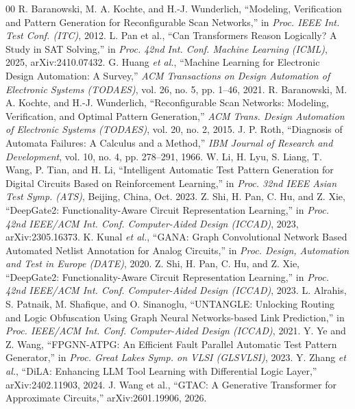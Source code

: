 \documentclass[conference]{IEEEtran}
\begin{document}
\begin{thebibliography}{00}
    R. Baranowski, M. A. Kochte, and H.-J. Wunderlich, ``Modeling, Verification and Pattern Generation for Reconfigurable Scan Networks,'' in \emph{Proc. IEEE Int. Test Conf. (ITC)}, 2012.
    L. Pan et al., ``Can Transformers Reason Logically? A Study in SAT Solving,'' in \emph{Proc. 42nd Int. Conf. Machine Learning (ICML)}, 2025, arXiv:2410.07432.
    G. Huang \emph{et al.}, ``Machine Learning for Electronic Design Automation: A Survey,'' \emph{ACM Transactions on Design Automation of Electronic Systems (TODAES)}, vol. 26, no. 5, pp. 1--46, 2021.
    R. Baranowski, M. A. Kochte, and H.-J. Wunderlich, ``Reconfigurable Scan Networks: Modeling, Verification, and Optimal Pattern Generation,'' \emph{ACM Trans. Design Automation of Electronic Systems (TODAES)}, vol. 20, no. 2, 2015.
    J. P. Roth, ``Diagnosis of Automata Failures: A Calculus and a Method,'' \emph{IBM Journal of Research and Development}, vol. 10, no. 4, pp. 278--291, 1966.
    W. Li, H. Lyu, S. Liang, T. Wang, P. Tian, and H. Li, ``Intelligent Automatic Test Pattern Generation for Digital Circuits Based on Reinforcement Learning,'' in \emph{Proc. 32nd IEEE Asian Test Symp. (ATS)}, Beijing, China, Oct. 2023.
    Z. Shi, H. Pan, C. Hu, and Z. Xie, ``DeepGate2: Functionality-Aware Circuit Representation Learning,'' in \emph{Proc. 42nd IEEE/ACM Int. Conf. Computer-Aided Design (ICCAD)}, 2023, arXiv:2305.16373.
    K. Kunal \emph{et al.}, ``GANA: Graph Convolutional Network Based Automated Netlist Annotation for Analog Circuits,'' in \emph{Proc. Design, Automation and Test in Europe (DATE)}, 2020.
    Z. Shi, H. Pan, C. Hu, and Z. Xie, ``DeepGate2: Functionality-Aware Circuit Representation Learning,'' in \emph{Proc. 42nd IEEE/ACM Int. Conf. Computer-Aided Design (ICCAD)}, 2023.
    L. Alrahis, S. Patnaik, M. Shafique, and O. Sinanoglu, ``UNTANGLE: Unlocking Routing and Logic Obfuscation Using Graph Neural Networks-based Link Prediction,'' in \emph{Proc. IEEE/ACM Int. Conf. Computer-Aided Design (ICCAD)}, 2021.
    Y. Ye and Z. Wang, ``FPGNN-ATPG: An Efficient Fault Parallel Automatic Test Pattern Generator,'' in \emph{Proc. Great Lakes Symp. on VLSI (GLSVLSI)}, 2023.
    Y. Zhang \emph{et al.}, ``DiLA: Enhancing LLM Tool Learning with Differential Logic Layer,'' arXiv:2402.11903, 2024.
    J. Wang et al., ``GTAC: A Generative Transformer for Approximate Circuits,'' arXiv:2601.19906, 2026.

\end{thebibliography}
\end{document}
